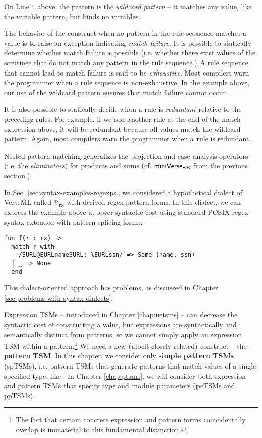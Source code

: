 On Line 4 above, the pattern \li{_} is the \emph{wildcard pattern} -- it matches any value, like the variable pattern, but binds no variables.

The behavior of the  construct when no pattern in the rule sequence matches a value is to raise an exception indicating \emph{match failure}. It is possible to statically determine whether match failure is possible (i.e. whether there exist values of the scrutinee that do not match any pattern in the rule sequence.) A rule sequence that cannot lead to match failure is said to be \emph{exhaustive}. Most compilers warn the programmer when a rule sequence is non-exhaustive. In the example above, our use of the wildcard pattern ensures that match failure cannot occur. 

It is also possible to statically decide when a rule is \emph{redundant} relative to the preceding rules. For example, if we add  another rule at the end of the match expression above, it will be redundant because all values match the wildcard pattern. Again, most compilers warn the programmer when a rule is redundant.

Nested pattern matching generalizes the projection and case analysis operators (i.e. the \emph{eliminators}) for products and sums (cf. $\mathsf{miniVerse}_\textbf{SE}$ from the previous section.) 

In Sec. \ref{sec:syntax-examples-regexps}, we considered a hypothetical dialect of VerseML called $\mathcal{V}_\texttt{rx}$ with derived regex pattern forms. In this dialect, we can express the example above at lower syntactic cost using standard POSIX regex syntax extended with pattern splicing forms:

\begin{lstlisting}
fun f(r : rx) => 
  match r with 
    /SURL@EURLnameSURL: %EURLssn/ => Some (name, ssn)
  | _ => None
  end
\end{lstlisting}
\noindent
This dialect-oriented approach has problems, as  discussed in Chapter \ref{sec:problems-with-syntax-dialects}.


Expression TSMs -- introduced in Chapter \ref{chap:uetsms} -- can decrease the syntactic cost of constructing a value, but expressions are syntactically and semantically distinct from patterns, so we cannot simply apply an expression TSM within a pattern.\footnote{The fact that certain concrete expression and pattern forms coincidentally overlap is immaterial to this fundamental distinction.} %
We need a new (albeit closely related) construct -- the \textbf{pattern TSM}. In this chapter, we consider only \textbf{simple pattern TSMs} (spTSMs), i.e. pattern TSMs that generate patterns that match values of a single specified type, like . In Chapter \ref{chap:ptsms}, we will consider both expression and pattern TSMs that specify type and module parameters (peTSMs and ppTSMs). 

